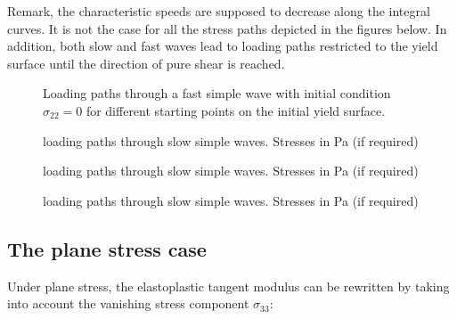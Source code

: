 Remark, the characteristic speeds are supposed to decrease along the integral curves. It is not the case for all the stress paths depicted in the figures below. In addition, both slow and fast waves lead to loading paths restricted to the yield surface until the direction of pure shear is reached.
\begin{figure}[h!]
  \centering
  \caption{Loading paths through a fast simple wave with initial condition $\sigma_{22}=0$ for different starting points on the initial yield surface.}
  \label{fig:fast_path_plane_strains}
\end{figure}


\begin{figure}[h!]
  \centering
  \caption{loading paths through slow simple waves. Stresses in Pa (if required)}
  \label{fig:slow_path_plane_strains}
\end{figure}

\begin{figure}[h!]
  \centering
  \caption{loading paths through slow simple waves. Stresses in Pa (if required)}
  \label{fig:slow_path_plane_strains}
\end{figure}


\begin{figure}[h!]
  \centering
  \caption{loading paths through slow simple waves. Stresses in Pa (if required)}
  \label{fig:slow_path_plane_strains}
\end{figure}


\subsection{The plane stress case}
Under plane stress, the elastoplastic tangent modulus can be rewritten by taking into account the vanishing stress component $\sigma_{33}$:

